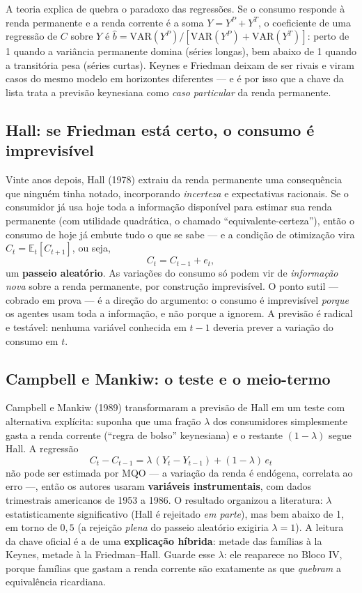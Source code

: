 \documentclass[12pt, a4paper]{article}
\newcommand{\E}{\mathbb{E}}
\newcommand{\VAR}{\mathrm{VAR}}
\begin{document}
A teoria explica de quebra o paradoxo das regressões. Se o consumo responde à
renda permanente e a renda corrente é a soma $Y = Y^P + Y^T$, o coeficiente de
uma regressão de $C$ sobre $Y$ é
$\hat{b} = \VAR(Y^P)/[\VAR(Y^P) + \VAR(Y^T)]$: perto de 1 quando a variância
permanente domina (séries longas), bem abaixo de 1 quando a transitória pesa
(séries curtas). Keynes e Friedman deixam de ser rivais e viram casos do mesmo
modelo em horizontes diferentes --- e é por isso que a chave da lista trata a
previsão keynesiana como \emph{caso particular} da renda permanente.

\subsection{Hall: se Friedman está certo, o consumo é imprevisível}

Vinte anos depois, Hall (1978) extraiu da renda permanente uma consequência
que ninguém tinha notado, incorporando \emph{incerteza} e expectativas
racionais. Se o consumidor já usa hoje toda a informação disponível para
estimar sua renda permanente (com utilidade quadrática, o chamado
``equivalente-certeza''), então o consumo de hoje já embute tudo o que se sabe
--- e a condição de otimização vira $C_t = \E_t[C_{t+1}]$, ou seja,
\[
C_t = C_{t-1} + e_t,
\]
um \textbf{passeio aleatório}. As variações do consumo só podem vir de
\emph{informação nova} sobre a renda permanente, por construção imprevisível.
O ponto sutil --- cobrado em prova --- é a direção do argumento: o consumo é
imprevisível \emph{porque} os agentes usam toda a informação, e não porque a
ignorem. A previsão é radical e testável: nenhuma variável conhecida em $t-1$
deveria prever a variação do consumo em $t$.

\subsection{Campbell e Mankiw: o teste e o meio-termo}

Campbell e Mankiw (1989) transformaram a previsão de Hall em um teste com
alternativa explícita: suponha que uma fração $\lambda$ dos consumidores
simplesmente gasta a renda corrente (``regra de bolso'' keynesiana) e o
restante $(1-\lambda)$ segue Hall. A regressão
\[
C_t - C_{t-1} = \lambda\,(Y_t - Y_{t-1}) + (1-\lambda)\,e_t
\]
não pode ser estimada por MQO --- a variação da renda é endógena, correlata ao
erro ---, então os autores usaram \textbf{variáveis instrumentais}, com dados
trimestrais americanos de 1953 a 1986. O resultado organizou a literatura:
$\lambda$ estatisticamente significativo (Hall é rejeitado \emph{em parte}),
mas bem abaixo de 1, em torno de $0{,}5$ (a rejeição \emph{plena} do passeio
aleatório exigiria $\lambda = 1$). A leitura da chave oficial é a de uma
\textbf{explicação híbrida}: metade das famílias à la Keynes, metade à la
Friedman--Hall. Guarde esse $\lambda$: ele reaparece no Bloco IV, porque
famílias que gastam a renda corrente são exatamente as que \emph{quebram} a
equivalência ricardiana.
\end{document}
